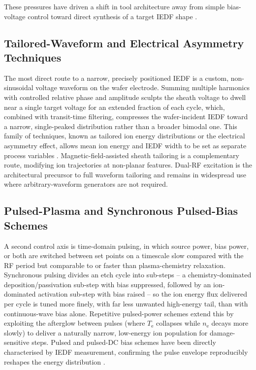 These pressures have driven a shift in tool architecture away from simple bias-voltage control toward direct synthesis of a target IEDF shape \cite{ref0539,ref0540,ref0541}.

\subsection{Tailored-Waveform and Electrical Asymmetry Techniques}

The most direct route to a narrow, precisely positioned IEDF is a custom, non-sinusoidal voltage waveform on the wafer electrode. Summing multiple harmonics with controlled relative phase and amplitude sculpts the sheath voltage to dwell near a single target voltage for an extended fraction of each cycle, which, combined with transit-time filtering, compresses the wafer-incident IEDF toward a narrow, single-peaked distribution rather than a broader bimodal one. This family of techniques, known as tailored ion energy distributions or the electrical asymmetry effect, allows mean ion energy and IEDF width to be set as separate process variables \cite{ref0541}. Magnetic-field-assisted sheath tailoring is a complementary route, modifying ion trajectories at non-planar features. Dual-RF excitation is the architectural precursor to full waveform tailoring and remains in widespread use where arbitrary-waveform generators are not required.

\subsection{Pulsed-Plasma and Synchronous Pulsed-Bias Schemes}

A second control axis is time-domain pulsing, in which source power, bias power, or both are switched between set points on a timescale slow compared with the RF period but comparable to or faster than plasma-chemistry relaxation. Synchronous pulsing divides an etch cycle into sub-steps -- a chemistry-dominated deposition/passivation sub-step with bias suppressed, followed by an ion-dominated activation sub-step with bias raised -- so the ion energy flux delivered per cycle is tuned more finely, with far less unwanted high-energy tail, than with continuous-wave bias alone. Repetitive pulsed-power schemes extend this by exploiting the afterglow between pulses (where $T_{\mathrm{e}}$ collapses while $n_{\mathrm{e}}$ decays more slowly) to deliver a naturally narrow, low-energy ion population for damage-sensitive steps. Pulsed and pulsed-DC bias schemes have been directly characterised by IEDF measurement, confirming the pulse envelope reproducibly reshapes the energy distribution \cite{ref0540}.

